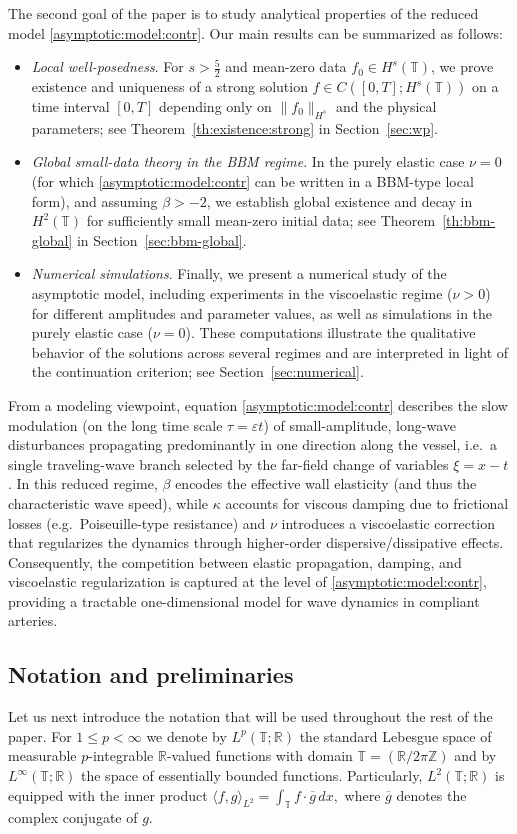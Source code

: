\documentclass[reqno]{amsart}
\newcommand{\RR}{\mathbb R}
\newcommand{\TT}{\mathbb T}
\theoremstyle{definition}
\numberwithin{equation}{section}
\numberwithin{theorem}{section}
\numberwithin{definition}{section}
\begin{document}
The second goal of the paper is to study analytical properties of the reduced model \eqref{asymptotic:model:contr}.
Our main results can be summarized as follows:
\begin{itemize}
	\item \emph{Local well-posedness}. For $s>\frac52$ and mean-zero data $f_0\in H^s(\TT)$, we prove existence and uniqueness
	of a strong solution $f\in C([0,T];H^s(\TT))$ on a time interval $[0,T]$ depending only on $\|f_0\|_{H^s}$ and the physical
	parameters; see Theorem~\ref{th:existence:strong} in Section~\ref{sec:wp}.
	\item \emph{Global small-data theory in the BBM regime}. In the purely elastic case $\nu=0$ (for which
	\eqref{asymptotic:model:contr} can be written in a BBM-type local form), and assuming $\beta>-2$, we establish global
	existence and decay in $H^2(\TT)$ for sufficiently small mean-zero initial data; see
	Theorem~\ref{th:bbm-global} in Section~\ref{sec:bbm-global}.
\item \emph{Numerical simulations}. Finally, we present a numerical study of the asymptotic model, including experiments in the viscoelastic regime ($\nu>0$) for different amplitudes and parameter values, as well as simulations in the purely elastic case ($\nu=0$). These computations illustrate the qualitative behavior of the solutions across several regimes and are interpreted in light of the continuation criterion; see Section~\ref{sec:numerical}.
\end{itemize}
\medskip
From a modeling viewpoint, equation \eqref{asymptotic:model:contr} describes the slow modulation (on the long time scale
$\tau=\varepsilon t$) of small-amplitude, long-wave disturbances propagating predominantly in one direction along the vessel,
i.e.\ a single traveling-wave branch selected by the far-field change of variables $\xi=x-t$. In this reduced regime,
$\beta$ encodes the effective wall elasticity (and thus the characteristic wave speed), while $\kappa$ accounts for viscous
damping due to frictional losses (e.g.\ Poiseuille-type resistance) and $\nu$ introduces a viscoelastic correction that
regularizes the dynamics through higher-order dispersive/dissipative effects. Consequently, the competition between
elastic propagation, damping, and viscoelastic regularization is captured at the level of \eqref{asymptotic:model:contr},
providing a tractable one-dimensional model for wave dynamics in compliant arteries.



\subsection{Notation and preliminaries}
Let us next introduce the notation that will be used throughout the rest of the paper. 
	For  $1\leq p<\infty$ we denote by  $L^p(\TT;\RR)$ the standard Lebesgue space of measurable $p$-integrable $\RR$-valued functions with domain $\TT=(\RR/2\pi\mathbb Z)$ and by  $L^\infty(\TT;\RR)$ the space of essentially bounded functions. Particularly, $L^2(\TT;\RR)$ is equipped with the inner product 
	$
	\langle f,g\rangle_{L^2}=\int_{\TT}f\cdot\overline{g}\, dx,
	$
	where $\overline{g}$ denotes the complex conjugate of $g$.  \medskip
	
\end{document}

